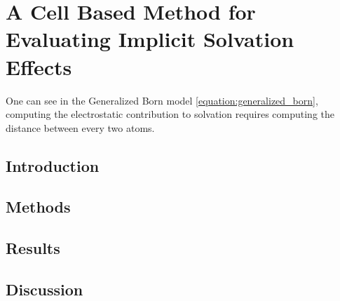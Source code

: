 \chapter[Cell Based Implicit Solvent]{A Cell Based Method for Evaluating Implicit Solvation Effects}
\label{chapter:cell_solvent}

One can see in the Generalized Born model \eqref{equation:generalized_born}, computing the electrostatic contribution to solvation requires computing the distance between every two atoms.

\section{Introduction}
\label{sec:cell/intro}


\section{Methods}
\label{sec:cell/methods}


\section{Results}
\label{sec:cell/results}


\section{Discussion}
\label{sec:cell/discussion}

